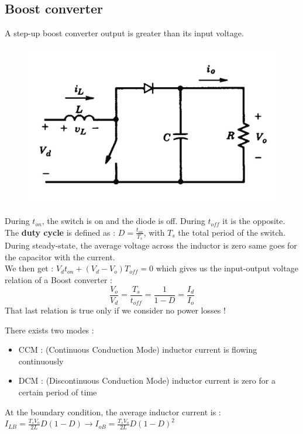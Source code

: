 \documentclass[../main.tex]{subfiles}
\begin{document}
\localtableofcontents

\subsection{Boost converter}
A step-up boost converter output is greater than its input voltage. \\

\begin{figure}[hbt!]
    \centering
    \includegraphics[width=0.5\linewidth]{IMAGES/Indus_el/IMG_0177.jpeg}
\end{figure}

During $t_{on}$, the switch is on and the diode is off. During $t_{off}$ it is the opposite. \\

The \textbf{duty cycle} is defined as : $D = \frac{t_{on}}{T_s}$, with $T_s$ the total period of the switch.\\
During steady-state, the average voltage across the inductor is zero same goes for the capacitor with the current. \\
We then get : $V_d t_{on} + (V_d - V_o)T_{off} = 0$ which gives us the input-output voltage relation of a Boost converter : \begin{equation}
    \frac{V_o}{V_d} = \frac{T_s}{t_{off}} = \frac{1}{1-D} = \frac{I_d}{I_o}
\end{equation}
\warning That last relation is true only if we consider no power losses !

There exists two modes : \begin{itemize}
    \item CCM : (Continuous Conduction Mode) inductor current is flowing continuously\\
    \item DCM : (Discontinuous Conduction Mode) inductor current is zero for a certain period of time\\
\end{itemize}

At the boundary condition, the average inductor current is : $I_{LB} = \frac{T_s V_o}{2L} D(1-D) \rightarrow I_{oB} = \frac{T_s V_o}{2L} D (1-D)^2$\\
\end{document}
